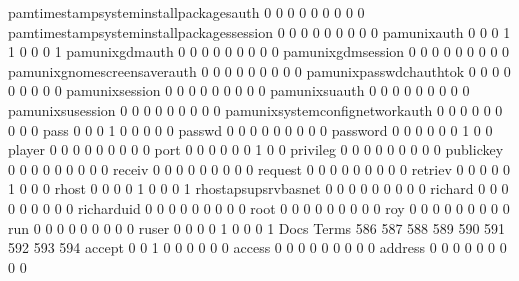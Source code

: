 \documentclass[compress,8pt]{beamer}
\begin{document}
\begin{frame}
\begin{Schunk}
  pamtimestampsysteminstallpackagesauth      0   0   0   0   0   0   0   0   0
  pamtimestampsysteminstallpackagessession   0   0   0   0   0   0   0   0   0
  pamunixauth                                0   0   0   1   1   0   0   0   1
  pamunixgdmauth                             0   0   0   0   0   0   0   0   0
  pamunixgdmsession                          0   0   0   0   0   0   0   0   0
  pamunixgnomescreensaverauth                0   0   0   0   0   0   0   0   0
  pamunixpasswdchauthtok                     0   0   0   0   0   0   0   0   0
  pamunixsession                             0   0   0   0   0   0   0   0   0
  pamunixsuauth                              0   0   0   0   0   0   0   0   0
  pamunixsusession                           0   0   0   0   0   0   0   0   0
  pamunixsystemconfignetworkauth             0   0   0   0   0   0   0   0   0
  pass                                       0   0   0   1   0   0   0   0   0
  passwd                                     0   0   0   0   0   0   0   0   0
  password                                   0   0   0   0   0   0   1   0   0
  player                                     0   0   0   0   0   0   0   0   0
  port                                       0   0   0   0   0   0   1   0   0
  privileg                                   0   0   0   0   0   0   0   0   0
  publickey                                  0   0   0   0   0   0   0   0   0
  receiv                                     0   0   0   0   0   0   0   0   0
  request                                    0   0   0   0   0   0   0   0   0
  retriev                                    0   0   0   0   0   1   0   0   0
  rhost                                      0   0   0   0   1   0   0   0   1
  rhostapsupsrvbasnet                        0   0   0   0   0   0   0   0   0
  richard                                    0   0   0   0   0   0   0   0   0
  richarduid                                 0   0   0   0   0   0   0   0   0
  root                                       0   0   0   0   0   0   0   0   0
  roy                                        0   0   0   0   0   0   0   0   0
  run                                        0   0   0   0   0   0   0   0   0
  ruser                                      0   0   0   0   1   0   0   0   1
                                          Docs
Terms                                      586 587 588 589 590 591 592 593 594
  accept                                     0   0   1   0   0   0   0   0   0
  access                                     0   0   0   0   0   0   0   0   0
  address                                    0   0   0   0   0   0   0   0   0

\end{Schunk}
\end{frame}
\end{document}
